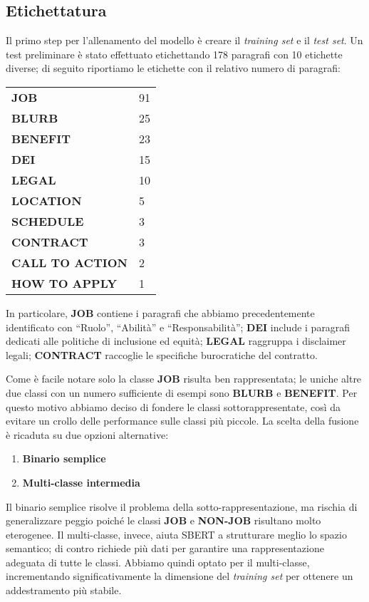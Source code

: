 \subsection{Etichettatura}

\noindent Il primo step per l'allenamento del modello è creare il \textit{training set} e il \textit{test set}. Un test preliminare è stato effettuato etichettando 178 paragrafi con 10 etichette diverse; di seguito riportiamo le etichette con il relativo numero di paragrafi:

\begin{center}
\begin{tabular}{ll}
\textbf{JOB} & 91 \\
\textbf{BLURB} & 25 \\
\textbf{BENEFIT} & 23 \\
\textbf{DEI} & 15 \\
\textbf{LEGAL} & 10 \\
\textbf{LOCATION} & 5 \\
\textbf{SCHEDULE} & 3 \\
\textbf{CONTRACT} & 3 \\
\textbf{CALL TO ACTION} & 2 \\
\textbf{HOW TO APPLY} & 1 \\
\end{tabular}
\end{center}

\noindent In particolare, \textbf{JOB} contiene i paragrafi che abbiamo precedentemente identificato con ``Ruolo'', ``Abilità'' e ``Responsabilità''; \textbf{DEI} include i paragrafi dedicati alle politiche di inclusione ed equità; \textbf{LEGAL} raggruppa i disclaimer legali; \textbf{CONTRACT} raccoglie le specifiche burocratiche del contratto.

\noindent Come è facile notare solo la classe \textbf{JOB} risulta ben rappresentata; le uniche altre due classi con un numero sufficiente di esempi sono \textbf{BLURB} e \textbf{BENEFIT}. Per questo motivo abbiamo deciso di fondere le classi sottorappresentate, così da evitare un crollo delle performance sulle classi più piccole. La scelta della fusione è ricaduta su due opzioni alternative:

\begin{enumerate}
    \item \textbf{Binario semplice}
    \item \textbf{Multi-classe intermedia}
\end{enumerate}

\noindent Il binario semplice risolve il problema della sotto-rappresentazione, ma rischia di generalizzare peggio poiché le classi \textbf{JOB} e \textbf{NON-JOB} risultano molto eterogenee. Il multi-classe, invece, aiuta SBERT a strutturare meglio lo spazio semantico; di contro richiede più dati per garantire una rappresentazione adeguata di tutte le classi. Abbiamo quindi optato per il multi-classe, incrementando significativamente la dimensione del \textit{training set} per ottenere un addestramento più stabile.

